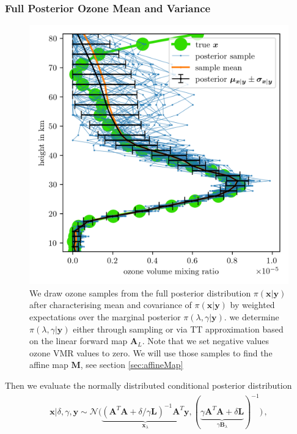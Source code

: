 \subsubsection{Full Posterior Ozone Mean and Variance}
\label{subsec:firstCond}
\begin{figure}[ht!]
	\centering
	\includegraphics{FirstTestRes.png}
	\caption[Ozone samples of the full posterior.]{We draw ozone samples from the full posterior distribution $\pi(\bm{x}| \bm{y})$ after characterising mean and covariance of $\pi(\bm{x}| \bm{y})$ by weighted expectations over the marginal posterior $\pi(\lambda,\gamma | \bm{y})$. we determine  $\pi(\lambda, \gamma | \bm{y})$ either through sampling or via TT approximation based on the linear forward map $\bm{A}_L$. Note that we set negative values ozone VMR values to zero. We will use those samples to find the affine map $\bm{M}$, see section \ref{sec:affineMap}}
	\label{fig:O3Samp}
\end{figure}
Then we evaluate the normally distributed conditional posterior distribution
\begin{align}
	\bm{x}| \delta, \gamma, \bm{y}  \sim \mathcal{N}\big( \underbrace{ (\bm{A}^T \bm{A} + \delta / \gamma \bm{L} )^{-1} \bm{A}^T \bm{y}}_{\bm{x}_{\lambda}}, ( \underbrace{ \gamma \bm{A}^T \bm{A} + \delta \bm{L} }_{\gamma \bm{B}_{\lambda}}  )^{-1} \big) \, \label{eq:CondPost},
\end{align}
